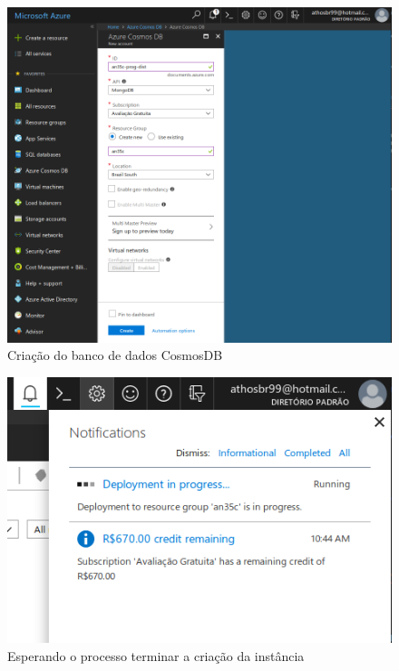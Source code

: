 \documentclass[12pt]{article}
\begin{document}
\begin{figure}[H]
	\label{fig:az1}
	\caption{Criação do banco de dados CosmosDB} 
	\includegraphics[scale=0.42]{img/az1.png}
	\centering
\end{figure}

\begin{figure}[H]
	\label{fig:az2}
	\caption{Esperando o processo terminar a criação da instância}
	\includegraphics[scale=0.45]{img/az2.png}
	\centering
\end{figure}
\end{document}
